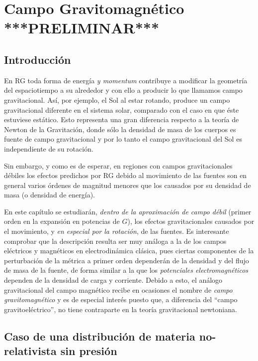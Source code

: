 \chapter{Campo Gravitomagnético ***PRELIMINAR***}\label{cap:gravito}

\section{Introducción}

En RG toda forma de energía \textit{y momentum} contribuye a modificar la geometría del espaciotiempo a su alrededor y con ello a producir lo que llamamos campo gravitacional. Así, por ejemplo, el Sol al estar rotando, produce un campo gravitacional diferente en el sistema solar, comparado con el caso en que éste estuviese estático. Esto representa una gran diferencia respecto a la teoría de Newton de la Gravitación, donde sólo la densidad de masa de los cuerpos es fuente de campo gravitacional y por lo tanto el campo gravitacional del Sol es independiente de su rotación.

Sin embargo, y como es de esperar, en regiones con campos gravitacionales débiles los efectos predichos por RG debido al movimiento de las fuentes son en general varios órdenes de magnitud menores que los causados por su densidad de masa (o densidad de energía).

En este capítulo se estudiarán, \textit{dentro de la aproximación de campo débil} (primer orden en la expansión en potencias de $G$), los efectos gravitacionales causados por el movimiento, y \textit{en especial por la rotación}, de las fuentes. Es interesante comprobar que la descripción resulta ser muy análoga a la de los campos eléctricos y magnéticos en electrodinámica clásica, pues ciertas componentes de la perturbación de la métrica a primer orden dependerán de la densidad y del flujo de masa de la fuente, de forma similar a la que los \textit{potenciales electromagnéticos} dependen de la densidad de carga y corriente. Debido a esto, el análogo gravitacional del campo magnético recibe en ocasiones el nombre de \textit{campo gravitomagnético} y es de especial interés puesto que, a diferencia del ``campo gravitoeléctrico'', no tiene contraparte en la teoría gravitacional newtoniana.


\section{Caso de una distribución de materia no-relativista sin presión}\label{sec:CDNR}


